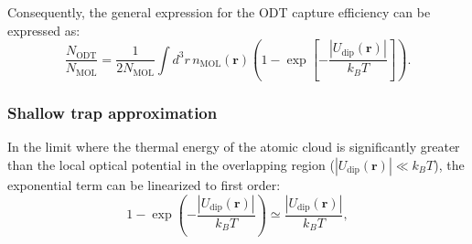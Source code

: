 Consequently, the general expression for the ODT capture efficiency can be expressed as:
\begin{equation}
    \frac{N_{\text{ODT}}}{N_{\text{MOL}}} = \frac{1}{2 N_{\text{MOL}}} \int d^3r \, n_{\text{MOL}}(\mathbf{r}) \left( 1 - \exp\left[ -\frac{|U_{\text{dip}}(\mathbf{r})|}{k_B T} \right] \right).
\label{eq:general_formuala_capture}
\end{equation}

\subsubsection{Shallow trap approximation}
In the limit where the thermal energy of the atomic cloud is significantly greater than the local optical potential in the overlapping region ($|U_{\text{dip}}(\mathbf{r})| \ll k_B T$), the exponential term can be linearized to first order:
\begin{equation}
    1 - \exp\left( - \frac{|U_\text{dip}(\mathbf{r})|}{k_B T} \right) \simeq \frac{|U_\text{dip}(\mathbf{r})|}{k_B T} ,
\end{equation}

